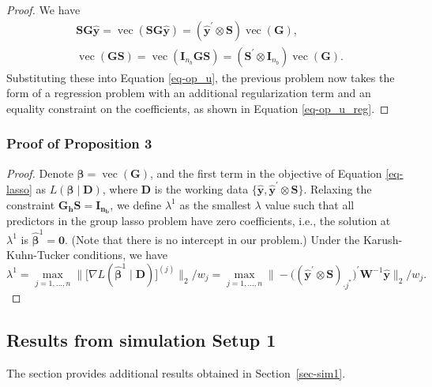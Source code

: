 \documentclass[
  11pt]{article}
\theoremstyle{plain}
\theoremstyle{remark}
\begin{document}
\begin{proof}
We have\vspace*{-0.4cm}\enlargethispage{0.4cm} \[
\begin{aligned}
& \bm{SG}\hat{\bm{y}} = \operatorname{vec}\left(\bm{SG}\hat{\bm{y}}\right) = \left(\hat{\bm{y}}^{\prime} \otimes \bm{S}\right) \operatorname{vec}(\bm{G}), \\
& \operatorname{vec}\left(\bm{G}\bm{S}\right) = \operatorname{vec}\left(\bm{I}_{n_b}\bm{G}\bm{S}\right) = \left(\bm{S}^{\prime} \otimes \bm{I}_{n_b}\right) \operatorname{vec}(\bm{G}).
\end{aligned}
\] Substituting these into Equation \eqref{eq-op_u}, the previous
problem now takes the form of a regression problem with an additional
regularization term and an equality constraint on the coefficients, as
shown in Equation \eqref{eq-op_u_reg}.
\end{proof}

\subsubsection{Proof of Proposition 3}\label{proof-of-proposition-3}

\begin{proof}
Denote \(\bm{\beta} = \operatorname{vec}(\bm{G})\), and the first term
in the objective of Equation \eqref{eq-lasso} as
\(L\left(\bm{\beta} \mid \bm{D}\right)\), where \(\bm{D}\) is the
working data
\(\{\hat{\bm{y}} , \hat{\bm{y}}^{\prime} \otimes \bm{S}\}\). Relaxing
the constraint \(\bm{G_h S}=\bm{I_{n_b}}\), we define \(\lambda^{1}\) as
the smallest \(\lambda\) value such that all predictors in the group
lasso problem have zero coefficients, i.e., the solution at
\(\lambda^{1}\) is \(\hat{\bm{\beta}}^{1}=\bm{0}\). (Note that there is
no intercept in our problem.) Under the Karush-Kuhn-Tucker conditions,
we have \[
\lambda^{1}
 = \max_{j=1, \ldots, n}\big\|\big[\nabla L(\hat{\bm{\beta}}^{1} \mid \bm{D})\big]^{(j)}\big\|_2 / w_j
 = \max_{j=1, \ldots, n}\big\|-\big((\hat{\bm{y}}^{\prime} \otimes \bm{S})_{\cdot j^{*}}\big)^{\prime} \bm{W}^{-1} \hat{\bm{y}}\big\|_2 / w_j.
\]
\end{proof}

\clearpage

\subsection{Results from simulation Setup 1}\label{appendix-sim1}

The section provides additional results obtained in
Section~\ref{sec-sim1}.
\end{document}

